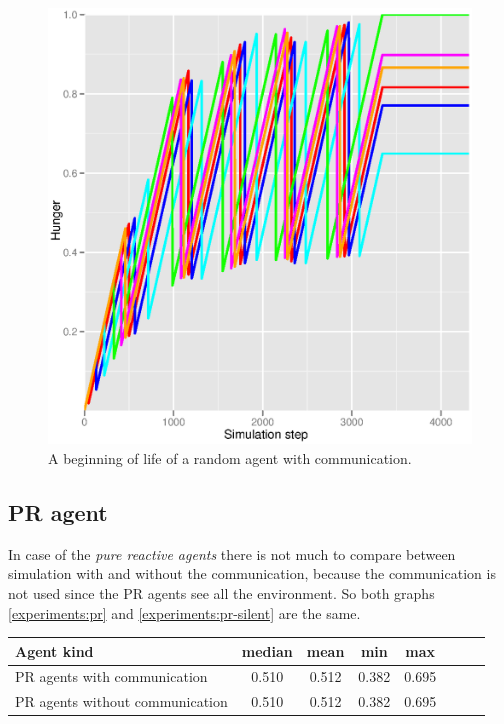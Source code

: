 \begin{figure}[h!]
  \centering                                
  \includegraphics[scale=0.4]{diagrams/experiments/random_start.eps}    
  \caption{A beginning of life of a random agent with communication.}
  \label{experiments:random-start}
\end{figure}        

\clearpage

\subsection{PR agent}

In case of the \emph{pure reactive agents} there is not much to compare between simulation with and without the communication, because the communication is not used since the PR agents see all the environment. So both graphs \ref{experiments:pr} and \ref{experiments:pr-silent} are the same.

\begin{center}   
  \begin{tabular}{l*{6}{c}r}
  Agent kind        & median & mean & min & max \\
  \hline  
  PR agents with communication        & 0.510 & 0.512 & 0.382 & 0.695 \\
  PR agents without communication     & 0.510 & 0.512 & 0.382 & 0.695 \\
  \end{tabular}                  
\end{center}

